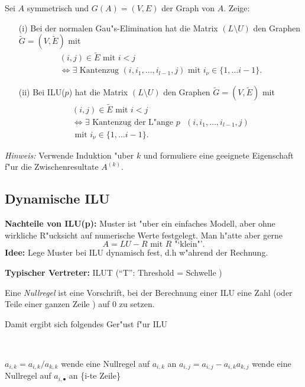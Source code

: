 \begin{aufg}
Sei $A$ symmetrisch und $G(A) = (V,E)$ der Graph von $A$.
Zeige:
\begin{itemize}
\item[(i)] Bei der normalen Gau"s-Elimination hat die Matrix $(L\setminus U)$ den
Graphen $\tilde{G} = (V,\tilde{E})$ mit
\begin{multline*}
(i,j) \in \tilde{E} \text{ mit } i < j\\ \iff \exists \text{ Kantenzug } (i,i_1, \dots , i_{l-1},j) \text{ mit }
  i_\nu \in \{1,\dots i-1\}.
\end{multline*}
\item[(ii)] Bei ILU($p$) hat die Matrix $(L\setminus U)$ den
Graphen $\tilde{G} = (V,\tilde{E})$ mit
\begin{multline*}
(i,j) \in \tilde{E} \text{ mit } i < j\\ \iff \exists \text{ Kantenzug der L"ange $p$ } (i,i_1, \dots , i_{l-1},j)\\ \text{ mit }
  i_\nu \in \{1,\dots i-1\}.
\end{multline*}
\end{itemize}
{\em Hinweis:} Verwende Induktion "uber $k$ und formuliere eine geeignete Eigenschaft
f"ur die Zwischenresultate $A^{(k)}$.
\end{aufg}

\subsection{Dynamische ILU}
{\bf Nachteile von ILU(p):} Muster ist "uber ein einfaches Modell, aber ohne
wirkliche R"ucksicht auf numerische Werte festgelegt. Man h"atte aber gerne
$$A = LU - R \text{  mit  } R \text{ "`klein"'}. $$
{\bf Idee:} Lege Muster bei ILU dynamisch fest, d.h w"ahrend der Rechnung.

\medskip

{\bf Typischer Vertreter:} ILUT ("`T"': Threshold = Schwelle )

\begin{defn}
Eine {\em Nullregel} ist eine Vorschrift, bei der Berechnung einer ILU eine
 Zahl (oder Teile einer ganzen Zeile ) auf $0$ zu setzen.
\end{defn}
Damit ergibt sich folgendes Ger"ust f"ur ILU

\begin{alg} \label{allgemeineILU}
~               %
\vspace*{-2\baselineskip}       %
\begin{algorithm}
  \begin{algorithmic}[1]
        \STATE $a_{i,k} = a_{i,k}/a_{k,k}$
        \STATE wende eine Nullregel auf $a_{i,k}$ an
          \STATE $a_{i,j} = a_{i,j} - a_{i,k} a_{k,j}$
        \ENDFOR
       \ENDIF
      \ENDFOR
    \STATE wende eine Nullregel auf $a_{i,\bullet}$ an \{i-te Zeile\}
    \ENDFOR
  \end{algorithmic}
\end{algorithm}
\end{alg}

